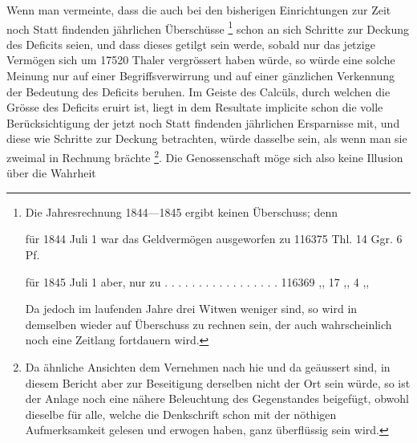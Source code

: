 Wenn man vermeinte, dass die auch bei den bisherigen Einrichtungen zur Zeit noch Statt findenden jährlichen Überschüsse {\renewcommand{\thefootnote}{**)}\footnote{Die Jahresrechnung 1844—1845 ergibt keinen Überschuss; denn
\par\noindent für 1844 Juli 1 war das Geldvermögen ausgeworfen zu 116375 Thl. 14 Ggr. 6 Pf.
\par\noindent für 1845 Juli 1 aber, nur zu . . . . . . . . . . . . . . . . . 116369 ,, 17 ,, 4 ,,
\par\noindent Da jedoch im laufenden Jahre drei Witwen weniger sind, so wird in demselben wieder auf Überschuss zu rechnen sein, der auch wahrscheinlich noch eine Zeitlang fortdauern wird.}} schon an sich Schritte zur Deckung des Deficits seien, und dass dieses getilgt sein werde, sobald nur das jetzige Vermögen sich um 17520 Thaler vergrössert haben würde, so würde eine solche Meinung nur auf einer Begriffsverwirrung und auf einer gänzlichen Verkennung der Bedeutung des Deficits beruhen. Im Geiste des Calcüls, durch welchen die Grösse des Deficits eruirt ist, liegt in dem Resultate implicite schon die volle Berücksichtigung der jetzt noch Statt findenden jährlichen Ersparnisse mit, und diese wie Schritte zur Deckung betrachten, würde dasselbe sein, als wenn man sie zweimal in Rechnung brächte {\renewcommand{\thefootnote}{***)}\footnote{Da ähnliche Ansichten dem Vernehmen nach hie und da geäussert sind, in diesem Bericht aber zur Beseitigung derselben nicht der Ort sein würde, so ist der Anlage noch eine nähere Beleuchtung des Gegenstandes beigefügt, obwohl dieselbe für alle, welche die Denkschrift schon mit der nöthigen Aufmerksamkeit gelesen und erwogen haben, ganz überflüssig sein wird.}}. Die Genossenschaft möge sich also keine Illusion über die Wahrheit
